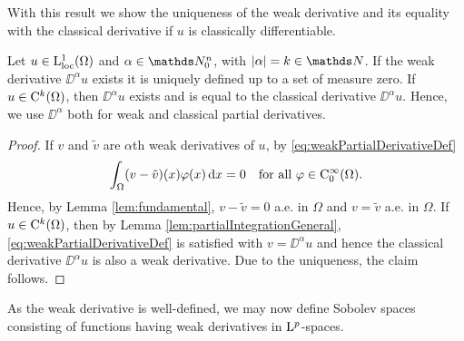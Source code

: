 With this result we show the uniqueness of the weak derivative and its equality with the classical derivative if $u$ is classically differentiable.

\begin{lem}
  Let $u \in \mathrm{L}_{\operatorname{loc}}^1(\Omega)$ and $\alpha \in \N_0^n$, with $|\alpha| = k \in \N$. 
  If the weak derivative $\DD^\alpha u$ exists it is uniquely defined up to a set of measure zero.
  If $u \in \mathrm{C}^k(\Omega)$, then $\DD^\alpha u$ exists and is equal to the classical derivative $\DD^\alpha u$. 
  Hence, we use $\DD^\alpha$ both for weak and classical partial derivatives.
\end{lem}

\begin{proof}
  If $v$ and $\tilde v$ are $\alpha$th weak derivatives of $u$, by \eqref{eq:weakPartialDerivativeDef}
  $$
  \int_\Omega (v - \tilde v) (x) \varphi(x) \, {\operatorname{d}\!{x}} = 0 \quad\text{for all } \varphi \in \mathrm{C}_0^\infty(\Omega).
  $$
  Hence, by Lemma \ref{lem:fundamental}, $v - \tilde v = 0$ a.e. in $\Omega$ and $v = \tilde v$ a.e. in $\Omega$.
  If $u \in \mathrm{C}^k(\Omega)$, then by Lemma \ref{lem:partialIntegrationGeneral}, \eqref{eq:weakPartialDerivativeDef} is satisfied with $v = \DD^\alpha u$ and hence the classical derivative $\DD^\alpha u$ is also a weak derivative.
  Due to the uniqueness, the claim follows.
\end{proof}

As the weak derivative is well-defined, we may now define Sobolev spaces consisting of functions having weak derivatives in $\mathrm{L}^p$-spaces.


